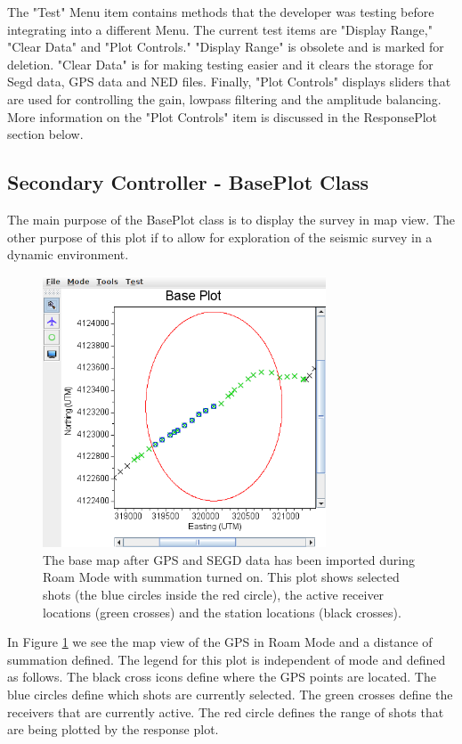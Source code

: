 \documentclass[12pt]{article}
\begin{document}
The "Test" Menu item contains methods that the developer was testing before integrating into a different Menu. The current test items are "Display Range," "Clear Data" and "Plot Controls." "Display Range" is obsolete and is marked for deletion. "Clear Data" is for making testing easier and it clears the storage for Segd data, GPS data and NED files. Finally, "Plot Controls" displays sliders that are used for controlling the gain, lowpass filtering and the amplitude balancing. More information on the "Plot Controls" item is discussed in the ResponsePlot section below.

\subsection{Secondary Controller - BasePlot Class}

The main purpose of the BasePlot class is to display the survey in map view. The other purpose of this plot if to allow for exploration of the seismic survey in a dynamic environment. 

\begin{figure}[H]
\centering
\includegraphics[width=0.75\textwidth]{./figs/fig1.png}
\caption{The base map after GPS and SEGD data has been imported during Roam Mode with summation turned on. This plot shows selected shots (the blue circles inside the red circle), the active receiver locations (green crosses) and the station locations (black crosses).}
\label{FIG:BP}
\end{figure}

In Figure \ref{FIG:BP} we see the map view of the GPS in Roam Mode and a distance of summation defined. The legend for this plot is independent of mode and defined as follows. The black cross icons define where the GPS points are located. The blue circles define which shots are currently selected. The green crosses define the receivers that are currently active. The red circle defines the range of shots that are being plotted by the response plot.
\end{document}
